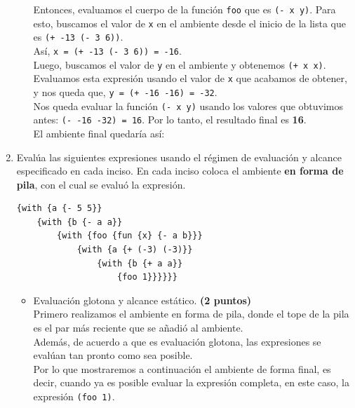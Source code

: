 \documentclass[11pt]{article}
\begin{document}
\begin{enumerate}[leftmargin=0.8cm]
\begin{itemize}
            Entonces, evaluamos el cuerpo de la función \texttt{foo} que es \texttt{(- x y)}. Para esto, buscamos el valor de \texttt{x} en el ambiente desde el inicio de la lista que es \texttt{(+ -13 (- 3 6))}.\\
            Así, \texttt{x = (+ -13 (- 3 6)) = -16}.\\
            Luego, buscamos el valor de \texttt{y} en el ambiente y obtenemos \texttt{(+ x x)}. Evaluamos esta expresión usando el valor de \texttt{x} que acabamos de obtener, y nos queda que, \texttt{y = (+ -16 -16) = -32}.\\
            Nos queda evaluar la función \texttt{(- x y)} usando los valores que obtuvimos antes: \texttt{(- -16 -32) = 16}. Por lo tanto, el resultado final es \textbf{16}.\\
            El ambiente final quedaría así:\\
            \hspace*{-1cm}
    \end{itemize}
    \item Evalúa las siguientes expresiones usando el régimen de evaluación y alcance especificado en cada inciso. En cada inciso coloca el ambiente \textbf{en forma de pila}, con el cual se evaluó la expresión.
    \begin{lstlisting}
{with {a {- 5 5}}
    {with {b {- a a}}
        {with {foo {fun {x} {- a b}}}
            {with {a {+ (-3) (-3)}}
                {with {b {+ a a}}
                    {foo 1}}}}}}
    \end{lstlisting}
    \begin{itemize}
        \item Evaluación glotona y alcance estático. \textbf{(2 puntos)}\\
        Primero realizamos el ambiente en forma de pila, donde el tope de la pila es el par más reciente que se añadió al ambiente.\\
        Además, de acuerdo a que es evaluación glotona, las expresiones se evalúan tan pronto como sea posible.\\
        Por lo que mostraremos a continuación el ambiente de forma final, es decir, cuando ya es posible evaluar la expresión completa, en este caso, la expresión \texttt{(foo 1)}.\\
        \begin{center}
            

\end{center}
\end{itemize}
\end{enumerate}
\end{document}

